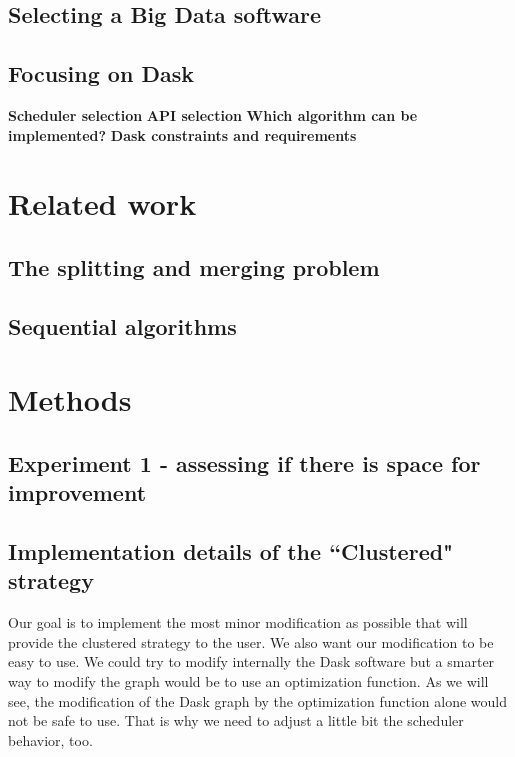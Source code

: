 \documentclass[conference]{IEEEtran}
\begin{document}
\subsection{Selecting a Big Data software}

\subsection{Focusing on Dask}
\textbf{Scheduler selection}
\textbf{API selection}
\textbf{Which algorithm can be implemented?}
\textbf{Dask constraints and requirements}

\section*{Related work}

\subsection{The splitting and merging problem}
\subsection{Sequential algorithms}

\section*{Methods}

\subsection{Experiment 1 - assessing if there is space for improvement}

\subsection{Implementation details of the ``Clustered" strategy}
Our goal is to implement the most minor modification as possible that will provide the clustered strategy to the user. We also want our modification to be easy to use. We could try to modify internally the Dask software but a smarter way to modify the graph would be to use an optimization function. As we will see, the modification of the Dask graph by the optimization function alone would not be safe to use. That is why we need to adjust a little bit the scheduler behavior, too.
\end{document}

